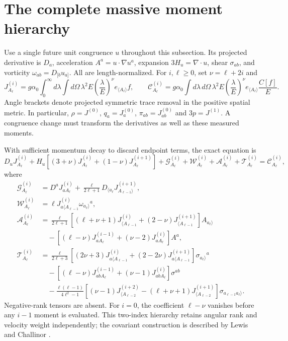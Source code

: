 \section{The complete massive moment hierarchy}
\label{ii:massive_hierarchy_section}
Use a single future unit congruence $u$ throughout this subsection. Its projected derivative is $D_a$, acceleration $A^a=u\cdot\nabla u^a$, expansion $3H_u=\nabla\cdot u$, shear $\sigma_{ab}$, and vorticity $\omega_{ab}=D_{[b}u_{a]}$. All are length-normalized. For $i,\ell\ge0$, set $\nu=\ell+2i$ and
\begin{equation}
 J^{(i)}_{A_\ell}=g\alpha_0\int_0^\infty d\lambda\int d\Omega\,
 \lambda^2E\left(\frac\lambda E\right)^\nu e_{\langle A_\ell\rangle}f,
 \qquad
 \mathcal C^{(i)}_{A_\ell}=g\alpha_0\int d\lambda\,d\Omega\,
 \lambda^2E\left(\frac\lambda E\right)^\nu e_{\langle A_\ell\rangle}\frac{C[f]}E.
 \label{ii:massive_hierarchy_definition}
\end{equation}
Angle brackets denote projected symmetric trace removal in the positive spatial metric. In particular, $\rho=J^{(0)}$, $q_a=J^{(0)}_a$, $\pi_{ab}=J^{(0)}_{ab}$ and $3p=J^{(1)}$. A congruence change must transform the derivatives as well as these measured moments.

With sufficient momentum decay to discard endpoint terms, the exact equation is
\begin{equation}
 D_uJ^{(i)}_{A_\ell}+H_u[(3+\nu)J^{(i)}_{A_\ell}+(1-\nu)J^{(i+1)}_{A_\ell}]
 +\mathcal G^{(i)}_{A_\ell}+\mathcal W^{(i)}_{A_\ell}
 +\mathcal A^{(i)}_{A_\ell}+\mathcal T^{(i)}_{A_\ell}
 =\mathcal C^{(i)}_{A_\ell},
 \label{ii:massive_hierarchy}
\end{equation}
where
\begin{align}
 \mathcal G^{(i)}_{A_\ell}
 &=D^aJ^{(i)}_{aA_\ell}+\frac\ell{2\ell+1}D_{\langle a_\ell}J^{(i+1)}_{A_{\ell-1}\rangle},\nonumber\\
 \mathcal W^{(i)}_{A_\ell}
 &=\ell J^{(i)}_{a\langle A_{\ell-1}}\omega_{a_\ell\rangle}{}^a,
 \label{ii:hierarchy_gradient_vorticity}\\
 \mathcal A^{(i)}_{A_\ell}
 &=\frac\ell{2\ell+1}[(\ell+\nu+1)J^{(i)}_{\langle A_{\ell-1}}
 +(2-\nu)J^{(i+1)}_{\langle A_{\ell-1}}]A_{a_\ell\rangle}\nonumber\\
 &\quad-[(\ell-\nu)J^{(i-1)}_{aA_\ell}+(\nu-2)J^{(i)}_{aA_\ell}]A^a,
 \label{ii:hierarchy_acceleration}\\
 \mathcal T^{(i)}_{A_\ell}
 &=\frac\ell{2\ell+3}[(2\nu+3)J^{(i)}_{a\langle A_{\ell-1}}
 +(2-2\nu)J^{(i+1)}_{a\langle A_{\ell-1}}]\sigma_{a_\ell\rangle}{}^a\nonumber\\
 &\quad-[(\ell-\nu)J^{(i-1)}_{abA_\ell}+(\nu-1)J^{(i)}_{abA_\ell}]\sigma^{ab}\nonumber\\
 &\quad-\frac{\ell(\ell-1)}{4\ell^2-1}
 [(\nu-1)J^{(i+2)}_{\langle A_{\ell-2}}
 -(\ell+\nu+1)J^{(i+1)}_{\langle A_{\ell-2}}]\sigma_{a_{\ell-1}a_\ell\rangle}.
 \label{ii:hierarchy_shear}
\end{align}
Negative-rank tensors are absent. For $i=0$, the coefficient $\ell-\nu$ vanishes before any $i-1$ moment is evaluated. This two-index hierarchy retains angular rank and velocity weight independently; the covariant construction is described by Lewis and Challinor \cite{LewisChallinor2002}.

